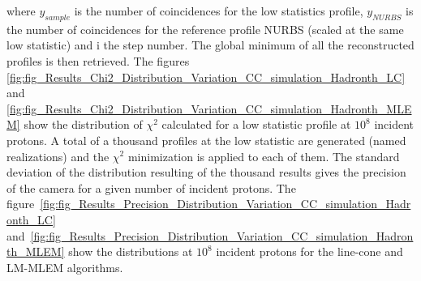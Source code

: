where $y_{sample}$ is the number of coincidences for the low statistics profile, $y_{NURBS}$ is the number of coincidences for the reference profile NURBS (scaled at the same low statistic) and i the step number.\newline
The global minimum of all the reconstructed profiles is then retrieved. The figures \ref{fig:fig_Results_Chi2_Distribution_Variation_CC_simulation_Hadronth_LC} and  \ref{fig:fig_Results_Chi2_Distribution_Variation_CC_simulation_Hadronth_MLEM} show the distribution of $\chi^2$ calculated for a low statistic profile at $10^8$ incident protons.\newline
A total of a thousand profiles at the low statistic are generated (named realizations) and the $\chi^2$ minimization is applied to each of them. The standard deviation of the distribution resulting of the thousand results gives the precision of the camera for a given number of incident protons. The figure~\ref{fig:fig_Results_Precision_Distribution_Variation_CC_simulation_Hadronth_LC} and~\ref{fig:fig_Results_Precision_Distribution_Variation_CC_simulation_Hadronth_MLEM} show the distributions at $10^8$ incident protons for the line-cone and LM-MLEM algorithms.



